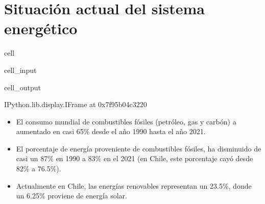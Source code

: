\documentclass[letterpaper,10pt,english]{jupyterBook}
\begin{document}
\section{Situación actual del sistema energético}
\label{\detokenize{0_introduccion/0_introduccion:situacion-actual-del-sistema-energetico}}
\begin{sphinxuseclass}{cell}\begin{sphinxVerbatimInput}

\begin{sphinxuseclass}{cell_input}
\begin{sphinxVerbatim}[commandchars=\\\{\}]
     
  
\end{sphinxVerbatim}

\end{sphinxuseclass}\end{sphinxVerbatimInput}
\begin{sphinxVerbatimOutput}

\begin{sphinxuseclass}{cell_output}
\begin{sphinxVerbatim}[commandchars=\\\{\}]
\PYGZlt{}IPython.lib.display.IFrame at 0x7f95b04c3220\PYGZgt{}
\end{sphinxVerbatim}

\end{sphinxuseclass}\end{sphinxVerbatimOutput}

\end{sphinxuseclass}
\sphinxAtStartPar
{}
\begin{itemize}
\item {} 
\sphinxAtStartPar
El consumo mundial de combustibles fósiles (petróleo, gas y carbón) a aumentado en casi 65\% desde el año 1990 hasta el año 2021.

\item {} 
\sphinxAtStartPar
El porcentaje de energía proveniente de combustibles fósiles, ha disminuido de casi un 87\% en 1990 a 83\% en el 2021 (en Chile, este porcentaje cayó desde 82\% a 76.5\%).

\item {} 
\sphinxAtStartPar
Actualmente en Chile, las energías renovables representan un 23.5\%, donde un 6.25\% proviene de energía solar.

\end{itemize}
\end{document}
